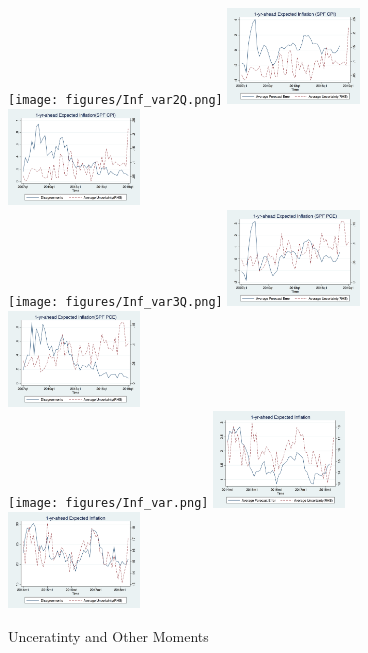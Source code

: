 \documentclass[]{article}
\begin{document}
\begin{figure}[h]\label{UnceratitnyOtherMoments}
	\centering
		\centering
	\smallskip
	\texttt{[image: figures/Inf\_var2Q.png]}
	\includegraphics[width=3.5cm]{figures/fe_var2Q.png}
	\includegraphics[width=3.5cm]{figures/var_disg2Q.png}\\
	\smallskip
	\texttt{[image: figures/Inf\_var3Q.png]}
	\includegraphics[width=3.5cm]{figures/fe_var3Q.png}
	\includegraphics[width=3.5cm]{figures/var_disg3Q.png}\\
	\smallskip	
	\texttt{[image: figures/Inf\_var.png]}
	\includegraphics[width=3.5cm]{figures/fe_var.png}
	\includegraphics[width=3.5cm]{figures/var_disg.png}\\
		\caption{Unceratinty and Other Moments}
\end{figure}
\end{document}
